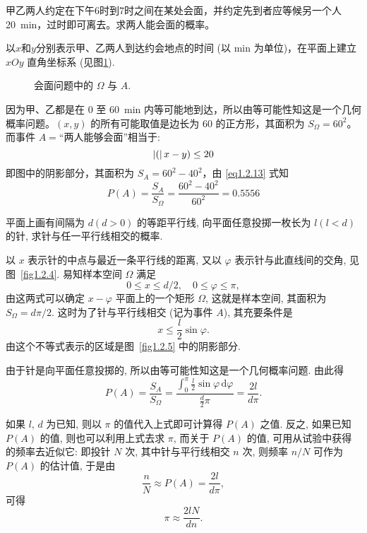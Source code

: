 \begin{example}[会商问题]
    甲乙两人约定在下午6时到7时之间在某处会面，并约定先到者应等候另一个人\SI{20}{\minute}，过时即可离去。求两人能会面的概率。
\end{example}
\begin{solution}
    以$x$和$y$分别表示甲、乙两人到达约会地点的时间 (以 \si{\minute} 为单位)，在平面上建立 $xOy$ 直角坐标系 (见图\ref{fig:meeting_problem}).
    \begin{figure}[!ht]
        \centering
        \caption{会面问题中的 $\Omega$ 与 $A$.}
        \label{fig:meeting_problem}
    \end{figure}
    因为甲、乙都是在 0 至 \SI{60}{\minute} 内等可能地到达，所以由等可能性知这是一个几何概率问题。$(x, y)$ 的所有可能取值是边长为 60 的正方形，其面积为 $S_\Omega = 60^2$。而事件 $A =$“两人能够会面”相当于:
    \[ \left\lvert(\right\rvert x - y) \le 20 \]
    即图中的阴影部分，其面积为 $S_A = 60^2 - 40^2$，由 \eqref{eq1.2.13} 式知
    \[ P (A) = \frac{S_A}{S_\Omega} = \frac{60^2 - 40^2}{60^2} = 0.5556 \]
\end{solution}

\begin{example}[蒲丰投针问题]
    平面上画有间隔为 $d (d > 0)$ 的等距平行线,
    向平面任意投掷一枚长为 $l (l<d)$ 的针,
    求针与任一平行线相交的概率.
\end{example}
\begin{solution}
    以 $x$ 表示针的中点与最近一条平行线的距离,
    又以 $\varphi$ 表示针与此直线间的交角,
    见图~\ref{fig1.2.4}.
    易知样本空间 $\Omega$ 满足
    \[
        0 \le x \le d/2, \quad 0 \le \varphi \le \pi,
    \]
    由这两式可以确定 $x - \varphi$ 平面上的一个矩形 $\Omega$,
    这就是样本空间,
    其面积为 $S_\Omega = d\pi/2$.
    这时为了针与平行线相交 (记为事件 $A$),
    其充要条件是
    \[
        x \le \frac{l}{2} \sin \varphi.
    \]
    由这个不等式表示的区域是图~\ref{fig1.2.5} 中的阴影部分.

    由于针是向平面任意投掷的,
    所以由等可能性知这是一个几何概率问题.
    由此得
    \[
        P (A) = \frac{S_A}{S_\Omega}
        = \frac{\int_0^\pi \frac{l}{2} \sin \varphi \, \mathrm{d} \varphi}{\frac{d}{2} \pi}
        = \frac{2l}{d\pi}.
    \]

    如果 $l$, $d$ 为已知,
    则以 $\pi$ 的值代入上式即可计算得 $P(A)$ 之值.
    反之,
    如果已知 $P(A)$ 的值,
    则也可以利用上式去求 $\pi$,
    而关于 $P(A)$ 的值,
    可用从试验中获得的频率去近似它:
    即投针 $N$ 次,
    其中针与平行线相交 $n$ 次,
    则频率 $n/N$ 可作为 $P(A)$ 的估计值,
    于是由
    \[
        \frac{n}{N} \approx P (A) = \frac{2l}{d\pi},
    \]
    可得
    \[
        \pi \approx \frac{2lN}{dn}.
    \]
\end{solution}

